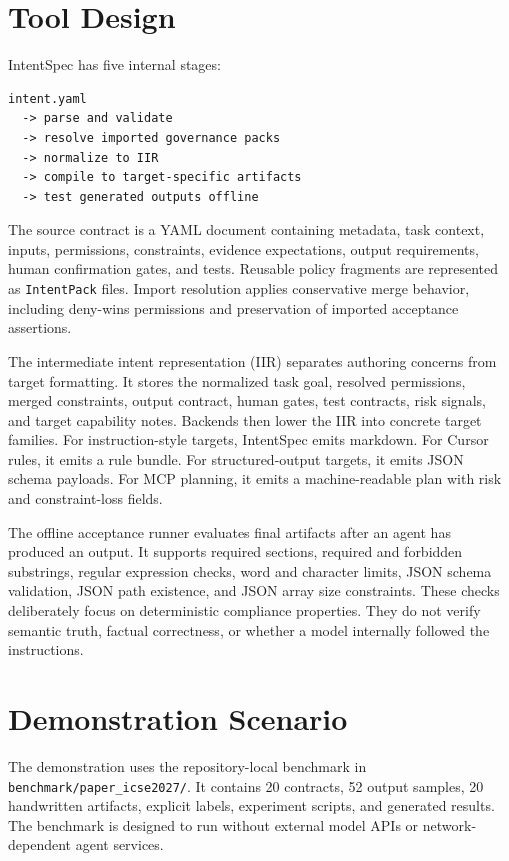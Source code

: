 \documentclass[11pt]{article}
\begin{document}
\section{Tool Design}

IntentSpec has five internal stages:
\begin{verbatim}
intent.yaml
  -> parse and validate
  -> resolve imported governance packs
  -> normalize to IIR
  -> compile to target-specific artifacts
  -> test generated outputs offline
\end{verbatim}

The source contract is a YAML document containing metadata, task context, inputs,
permissions, constraints, evidence expectations, output requirements, human
confirmation gates, and tests. Reusable policy fragments are represented as
\texttt{IntentPack} files. Import resolution applies conservative merge behavior,
including deny-wins permissions and preservation of imported acceptance assertions.

The intermediate intent representation (IIR) separates authoring concerns from
target formatting. It stores the normalized task goal, resolved permissions, merged
constraints, output contract, human gates, test contracts, risk signals, and target
capability notes. Backends then lower the IIR into concrete target families. For
instruction-style targets, IntentSpec emits markdown. For Cursor rules, it emits a
rule bundle. For structured-output targets, it emits JSON schema payloads. For MCP
planning, it emits a machine-readable plan with risk and constraint-loss fields.

The offline acceptance runner evaluates final artifacts after an agent has produced
an output. It supports required sections, required and forbidden substrings, regular
expression checks, word and character limits, JSON schema validation, JSON path
existence, and JSON array size constraints. These checks deliberately focus on
deterministic compliance properties. They do not verify semantic truth, factual
correctness, or whether a model internally followed the instructions.

\section{Demonstration Scenario}

The demonstration uses the repository-local benchmark in
\texttt{benchmark/paper\_icse2027/}. It contains 20 contracts, 52 output samples, 20
handwritten artifacts, explicit labels, experiment scripts, and generated results.
The benchmark is designed to run without external model APIs or network-dependent
agent services.
\end{document}
